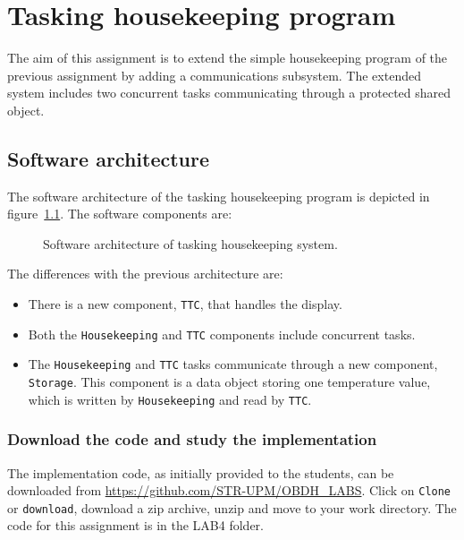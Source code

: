 \chapter{Tasking housekeeping program}\label{ch:Assignment4}

The aim of this assignment is to extend the simple housekeeping program of the previous assignment by adding a communications subsystem. The extended system includes two concurrent tasks communicating through a protected shared object.

\section{Software architecture}

The software architecture of the tasking housekeeping program is depicted in figure~\ref{fig:tasking}. The software components are:

\begin{figure}[h]
            \caption{Software architecture of tasking housekeeping system.}
            \label{fig:tasking}
\end{figure}

The differences with the previous architecture are:
\begin{itemize}
\item There is a new component, {\tt TTC}, that handles the display.
\item Both the {\tt Housekeeping} and {\tt TTC} components include concurrent tasks.
\item The {\tt Housekeeping} and {\tt TTC} tasks communicate through a new component, {\tt Storage}. This component is a data object storing one temperature value, which is written by {\tt Housekeeping} and read by {\tt TTC}.
\end{itemize}

\subsection{Download the code and study the implementation}

The implementation code, as initially provided to the students, can be downloaded from \url{https://github.com/STR-UPM/OBDH\_LABS}. Click on {\tt Clone} or {\tt download}, download a zip archive, unzip and move to your work directory. The code for this assignment is in the LAB4 folder.

